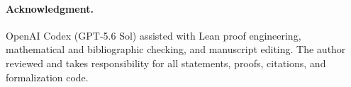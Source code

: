 \documentclass[11pt]{article}
\theoremstyle{remark}
\theoremstyle{definition}
\begin{document}
\paragraph{Acknowledgment.}
OpenAI Codex (GPT-5.6 Sol) assisted with Lean proof engineering,
mathematical and bibliographic checking, and manuscript editing.  The
author reviewed and takes responsibility for all statements, proofs,
citations, and formalization code.



\end{document}
